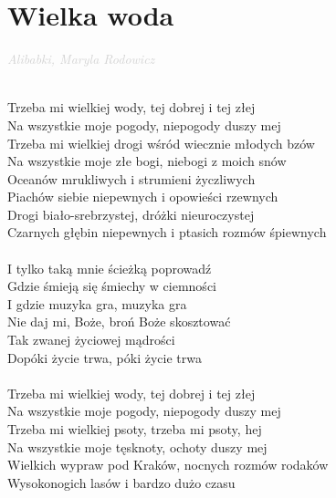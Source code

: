 \documentclass[a5paper, 10pt]{book}
\begin{document}
\section{Wielka woda}\textcolor{lightgray}{\textit{Alibabki, Maryla Rodowicz}}\\~\\
\begin{minipage}[t]{0.8\textwidth}
  Trzeba mi wielkiej wody, tej dobrej i tej złej\\
  Na wszystkie moje pogody, niepogody duszy mej\\
  Trzeba mi wielkiej drogi wśród wiecznie młodych bzów\\
  Na wszystkie moje złe bogi, niebogi z moich snów\\
  \hspace*{3mm}Oceanów mrukliwych i strumieni życzliwych\\
  \hspace*{3mm}Piachów siebie niepewnych i opowieści rzewnych\\
  \hspace*{3mm}Drogi biało-srebrzystej, dróżki nieuroczystej\\
  \hspace*{3mm}Czarnych głębin niepewnych i ptasich rozmów śpiewnych\\
  \\
  \hspace*{6mm}I tylko taką mnie ścieżką poprowadź\\
  \hspace*{6mm}Gdzie śmieją się śmiechy w ciemności\\
  \hspace*{6mm}I gdzie muzyka gra, muzyka gra\\
  \hspace*{6mm}Nie daj mi, Boże, broń Boże skosztować\\
  \hspace*{6mm}Tak zwanej życiowej mądrości\\
  \hspace*{6mm}Dopóki życie trwa, póki życie trwa\\
  \\
  Trzeba mi wielkiej wody, tej dobrej i tej złej\\
  Na wszystkie moje pogody, niepogody duszy mej\\
  Trzeba mi wielkiej psoty, trzeba mi psoty, hej\\
  Na wszystkie moje tęsknoty, ochoty duszy mej\\
  \hspace*{3mm}Wielkich wypraw pod Kraków, nocnych rozmów rodaków\\
  \hspace*{3mm}Wysokonogich lasów i bardzo dużo czasu\\

\end{minipage}
\end{document}
